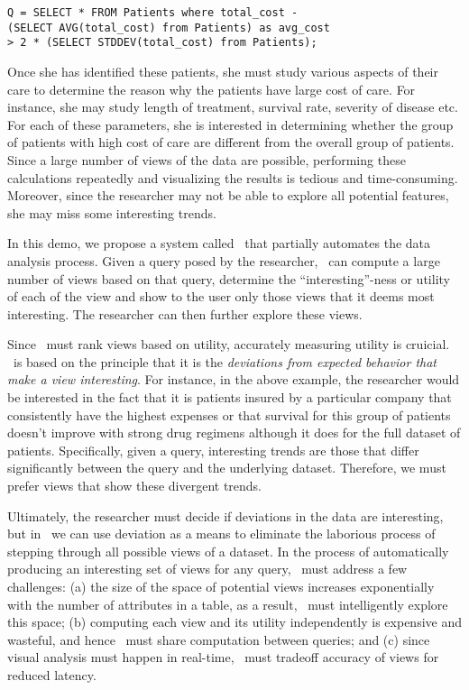 \noindent 
\begin{small}
\begin{verbatim}
Q = SELECT * FROM Patients where total_cost - 
(SELECT AVG(total_cost) from Patients) as avg_cost
> 2 * (SELECT STDDEV(total_cost) from Patients);
\end{verbatim}
\end{small}


Once she has identified these patients, she must study various aspects of their
care to determine the reason why the patients have large cost of care. For
instance, she may study length of treatment, survival rate, severity of disease
etc. For each of these parameters, she is interested in determining whether the
group of patients with high cost of care are different from the overall group of
patients. Since a large number of views of the data are possible, performing
these calculations repeatedly and visualizing the results is tedious and
time-consuming. Moreover, since the researcher may not be able to explore all
potential features, she may miss some interesting trends.

In this demo, we propose a system called \SeeDB\ that partially automates the
data analysis process. Given a query posed by the researcher, \SeeDB\ can
compute a large number of views based on that query, determine the
``interesting''-ness or utility of each of the view and show to the user only
those views that it deems most interesting. The researcher can then further
explore these views. 

Since \SeeDB\ must rank views based on utility, accurately measuring utility is
cruicial. \SeeDB\ is based on the principle that it is the {\it deviations from
expected behavior that make a view interesting}. For instance, in the above
example, the researcher would be interested in the fact that it is patients
insured by a particular company that consistently have the highest expenses or
that survival for this group of patients doesn't improve with strong drug
regimens although it does for the full dataset of patients. Specifically, given
a query, interesting trends are those that differ significantly between the
query and the underlying dataset. Therefore, we must prefer views that show
these divergent trends.

Ultimately, the researcher must decide if deviations in the data are
interesting, but in \SeeDB\ we can use deviation as a means to eliminate the
laborious process of stepping through all possible views of a dataset.
In the process of automatically producing an interesting set of views for any
query, \SeeDB\ must address a few challenges: (a) the size of
the space of potential views increases exponentially with the number of
attributes in a table, as a result, \SeeDB\ must intelligently explore this
space; (b) computing each view and its utility independently is expensive and
wasteful, and hence \SeeDB\ must share computation between queries; and (c)
since visual analysis must happen in real-time, \SeeDB\ must tradeoff accuracy
of views for reduced latency.

